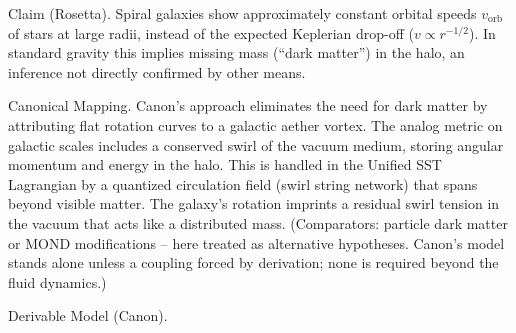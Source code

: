 \documentclass[11pt]{article}
\begin{document}
Claim (Rosetta). Spiral galaxies show approximately constant orbital speeds $v_{\text{orb}}$ of stars at large radii, instead of the expected Keplerian drop-off ($v \propto r^{-1/2}$). In standard gravity this implies missing mass (“dark matter”) in the halo, an inference not directly confirmed by other means.


Canonical Mapping. Canon’s approach eliminates the need for dark matter by attributing flat rotation curves to a galactic aether vortex. The analog metric on galactic scales includes a conserved swirl of the vacuum medium, storing angular momentum and energy in the halo. This is handled in the Unified SST Lagrangian by a quantized circulation field (swirl string network) that spans beyond visible matter. The galaxy’s rotation imprints a residual swirl tension in the vacuum that acts like a distributed mass. (Comparators: particle dark matter or MOND modifications – here treated as alternative hypotheses. Canon’s model stands alone unless a coupling forced by derivation; none is required beyond the fluid dynamics.)


Derivable Model (Canon).
\end{document}
